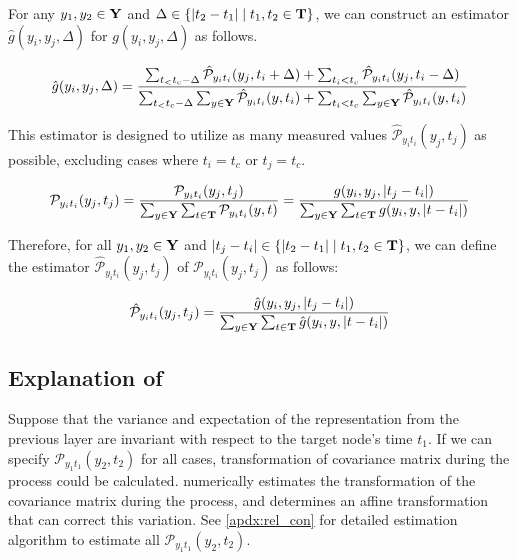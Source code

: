 For any $y_1, y_2 \in \bold{Y}$ and $\Delta \in \{|t_2 -t_1 | \mid t_1, t_2\in \bold{T}\}$, we can construct an estimator $\hat{g}(y_i, y_j, \Delta)$ for $g(y_i, y_j, \Delta)$ as follows.

\begin{align}
\hat{g}(y_i, y_j, \Delta)= {\sum_{t_< t_{c}-\Delta}\hat{\mathcal{P}}_{y_it_i}(y_j, t_i+\Delta)+\sum_{t_i<t_{c}} \hat{\mathcal{P}}_{y_it_i}(y_j, t_i-\Delta)\over \sum_{t_< t_{c}-\Delta}\sum_{y\in\bold Y}\hat{\mathcal{P}}_{y_it_i}(y, t_i)+\sum_{t_i<t_{c}}\sum_{y\in\bold Y}\hat{\mathcal{P}}_{y_it_i}(y, t_i)}
\end{align}

This estimator is designed to utilize as many measured values $\hat{\mathcal{P}}_{y_i t_i} (y_j ,t_j)$ as possible, excluding cases where $t_i=t_{c}$ or $t_j=t_{c}$.

\begin{align}
\mathcal P_{y_i t_i}(y_j, t_j)= {\mathcal P_{y_i t_i}(y_j, t_j)\over \sum_{y\in \bold{Y}}\sum_{t\in\bold{T}}\mathcal{P}_{y_i t_i}(y, t)}={g(y_i, y_j, |t_j-t_i|)\over \sum_{y\in \bold{Y}}\sum_{t\in\bold{T}}g(y_i, y, |t-t_i|)}
\end{align}

Therefore, for all $y_1, y_2 \in \bold{Y}$ and $|t_j - t_i |\in\{|t_2 -t_1 | \mid t_1, t_2\in \bold{T}\}$, we can define the estimator $\hat{\mathcal P}_{y_i t_i}(y_j, t_j)$ of $\mathcal P_{y_i t_i}(y_j, t_j)$ as follows:

\begin{align}
\hat{\mathcal P}_{y_i t_i}(y_j, t_j)={\hat{g}(y_i, y_j, |t_j-t_i|)\over \sum_{y\in \bold{Y}}\sum_{t\in\bold{T}}\hat{g}(y_i, y, |t-t_i|)}
\end{align}














\subsection{Explanation of \PNY}
\label{apdx:PNY}
Suppose that the variance and expectation of the representation from the previous layer are invariant with respect to the target node's time $t_1$. If we can specify $\mathcal{P}_{y_1 t_1}(y_2, t_2)$ for all cases, transformation of covariance matrix during the \PMP process could be calculated. \PNY numerically estimates the transformation of the covariance matrix during the \PMP process, and determines an affine transformation that can correct this variation. See \ref{apdx:rel_con} for detailed estimation algorithm to estimate all $\mathcal{P}_{y_1 t_1}(y_2, t_2)$.


